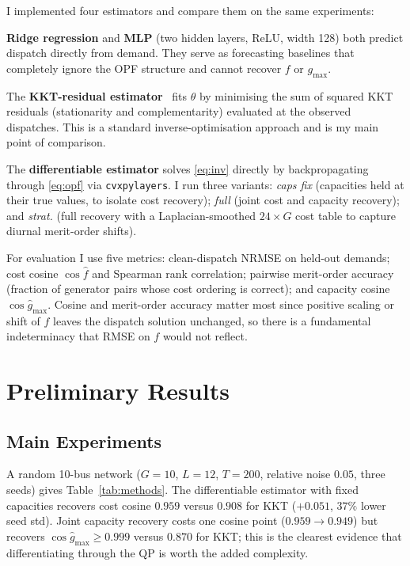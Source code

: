 \documentclass[10pt,letterpaper]{article}
\begin{document}
I implemented four estimators and compare them on the same
experiments:

\textbf{Ridge regression} and \textbf{MLP} (two hidden layers,
ReLU, width 128) both predict dispatch directly from demand.
They serve as forecasting baselines that completely ignore the
OPF structure and cannot recover $f$ or $g_{\max}$.

The \textbf{KKT-residual estimator}~\cite{keshavarz2011imputing,%
aswani2018inverse} fits $\theta$ by minimising the sum of squared
KKT residuals (stationarity and complementarity) evaluated at the
observed dispatches. This is a standard inverse-optimisation approach
and is my main point of comparison.

The \textbf{differentiable estimator} solves
\eqref{eq:inv} directly by backpropagating through \eqref{eq:opf}
via \texttt{cvxpylayers}. I run three variants:
\emph{caps fix} (capacities held at their true values, to isolate
cost recovery); \emph{full} (joint cost and capacity recovery);
and \emph{strat.} (full recovery with a Laplacian-smoothed
$24 \times G$ cost table to capture diurnal merit-order shifts).

For evaluation I use five metrics: clean-dispatch NRMSE on held-out
demands; cost cosine $\cos\hat f$ and Spearman rank correlation;
pairwise merit-order accuracy (fraction of generator pairs whose
cost ordering is correct); and capacity cosine $\cos\hat g_{\max}$.
Cosine and merit-order accuracy matter most since positive
scaling or shift of $f$ leaves the dispatch solution unchanged, so
there is a fundamental indeterminacy that RMSE on $f$ would not
reflect.

\section{Preliminary Results}\label{sec:results}

\subsection{Main Experiments}\label{sec:main}

A random 10-bus network ($G=10$, $L=12$, $T=200$, relative noise
$0.05$, three seeds) gives Table~\ref{tab:methods}.
The differentiable estimator with fixed capacities recovers cost
cosine $0.959$ versus $0.908$ for KKT ($+0.051$, $37\%$ lower
seed std). Joint capacity recovery costs one cosine point
($0.959 \to 0.949$) but recovers $\cos\hat g_{\max} \ge 0.999$
versus $0.870$ for KKT; this is the clearest evidence that differentiating
through the QP is worth the added complexity.
\end{document}
